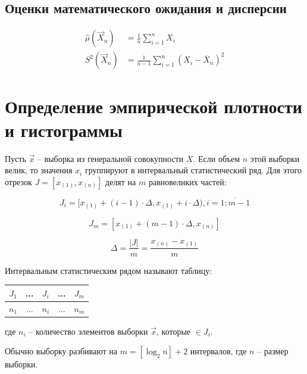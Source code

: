 \documentclass[12pt]{report}
\begin{document}
\subsection*{Оценки математического ожидания и дисперсии}
\begin{equation}
	\begin{aligned}
	\hat\mu(\vec X_n) &= \frac 1n \sum_{i=1}^n X_i\\
	S^2(\vec X_n) &= \frac 1{n-1} \sum_{i=1}^n (X_i-\overline X_n)^2
	\end{aligned}
\end{equation}

\section*{Определение эмпирической плотности и гистограммы}

Пусть $\vec x$ -- выборка из генеральной совокупности $X$. Если объем $n$ этой выборки велик, то значения $x_i$ группируют в интервальный статистический ряд. Для этого отрезок $J = [x_{(1)}, x_{(n)}]$ делят на $m$ равновеликих частей:

\begin{equation*}
	J_i = [x_{(1)} + (i - 1) \cdot \Delta, x_{(1)} + i \cdot \Delta), i = \overline{1; m - 1}
\end{equation*}

\begin{equation*}
	J_{m} = [x_{(1)} + (m - 1) \cdot \Delta, x_{(n)}]
\end{equation*}

\begin{equation*}
	\Delta = \frac{|J|}{m} = \frac{x_{(n)} - x_{(1)}}{m}
\end{equation*}

Интервальным статистическим рядом называют таблицу:

\begin{table}[htb]
	\centering
	\begin{tabular}{|c|c|c|c|c|}
		\hline
		$J_1$ & ... & $J_i$ & ... & $J_m$ \\
		\hline
		$n_1$ & ... & $n_i$ & ... & $n_m$ \\
		\hline
	\end{tabular}
\end{table}

где $n_i$ -- количество элементов выборки $\vec x$, которые $\in J_i$.

Обычно выборку разбивают на $m=[\log_2n]+2$ интервалов, где $n$ -- размер выборки.
\end{document}
